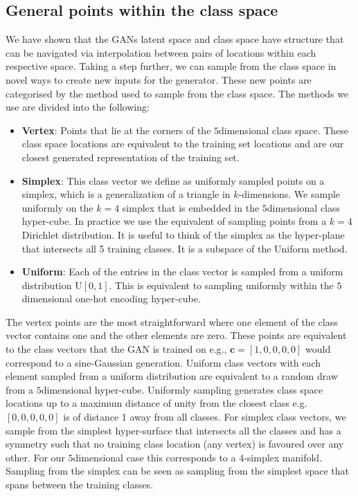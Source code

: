 \documentclass[12pt]{iopart}
\newcommand{\ndimensional}[1]{$#1$\nobreakdash\discretionary{-}{-}{-}dimensional}
\begin{document}
\subsection{General points within the class space}
We have shown that the \acp{GAN} latent space and class space have structure that can be navigated via interpolation between pairs of locations within each respective space. Taking a step further, we can sample from the class space in novel ways to create new inputs for the generator. These new points are categorised by the method used to sample from the class space. The methods we use are divided into the following: 
%
\begin{itemize}
%
\item {\bf Vertex}: Points that lie at the corners of the \ndimensional{5} class space. These class space locations are equivalent to the training set locations and are our closest generated representation of the training set.
%
\item {\bf Simplex}: This class vector we define as uniformly sampled points on a simplex, which is a generalization of a triangle in $k$-dimensions. We sample uniformly on the $k=4$ simplex that is embedded in the \ndimensional{5} class hyper-cube. In practice we use the equivalent of sampling points from a $k=4$ Dirichlet distribution. It is useful to think of the simplex as the hyper-plane that intersects all 5 training classes. It is a subspace of the Uniform method.  
%
\item {\bf Uniform}: Each of the entries in the class vector is sampled from a uniform distribution $\text{U}[0,1]$. This is equivalent to sampling uniformly within the \ndimensional{5} one-hot encoding hyper-cube.
%
\end{itemize}

The vertex points are the most straightforward where one element of the class vector contains one and the other elements are zero. These points are equivalent to the class vectors that the \ac{GAN} is trained on e.g., $\mathbf{c} = [1,0,0,0,0]$ would correspond to a sine-Gaussian generation. Uniform class vectors with each element sampled from a uniform distribution are equivalent to a random draw from a \ndimensional{5} hyper-cube. Uniformly sampling generates class space locations up to a maximum distance of unity from the closest class e.g. $[0,0,0,0,0]$ is of distance 1 away from all classes. For simplex class vectors, we sample from the simplest hyper-surface that intersects all the classes and has a symmetry such that no training class location (any vertex) is favoured over any other. For our \ndimensional{5} case this corresponds to a 4-simplex manifold. Sampling from the simplex can be seen as sampling from the simplest space that spans between the training classes.   
\end{document}
